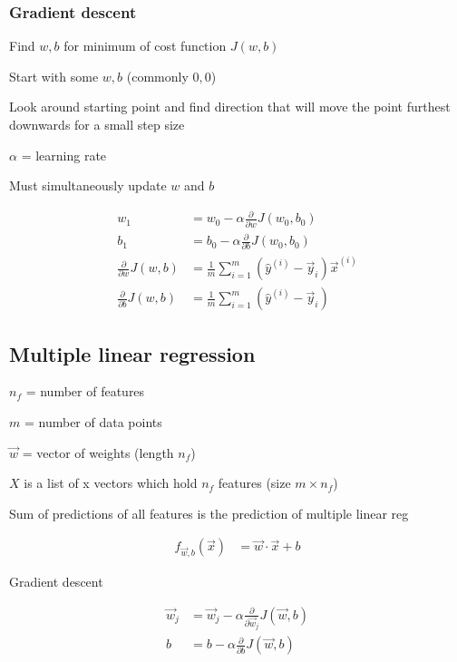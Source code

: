 \documentclass[12pt]{article}
\begin{document}
\subsubsection{Gradient descent}

Find $w,b$ for minimum of cost function $J(w,b)$

\begin{myenumerate}
	\item Start with some $w,b$ (commonly $0,0$)
	\item Look around starting point and find direction that will move the point furthest downwards for a small step size
\end{myenumerate}

$\alpha$ = learning rate

Must simultaneously update $w$ and $b$

\begin{align*}
    w_1 &= w_0 - \alpha \frac{\partial}{\partial w} J(w_0,b_0)\\
    b_1 &= b_0 - \alpha \frac{\partial}{\partial b} J(w_0,b_0)\\
    \frac{\partial}{\partial w} J(w,b) &= \frac{1}{m} \sum_{i=1}^m ({\hat y}^{(i)} - \vec{y}_i) \vec{x}^{(i)}\\
    \frac{\partial}{\partial b} J(w,b) &= \frac{1}{m} \sum_{i=1}^m ({\hat y}^{(i)} - \vec{y}_i)
\end{align*}

\subsection{Multiple linear regression}

$n_f$ = number of features

$m$ = number of data points

$\vec{w}$ = vector of weights (length $n_f$)

$X$ is a list of x vectors which hold $n_f$ features (size $m \times n_f$)

Sum of predictions of all features is the prediction of multiple linear reg

\begin{align*}
    f_{\vec{w},b}(\vec{x}) &= \vec{w} \cdot \vec{x} + b
\end{align*}

Gradient descent

\begin{align*}
    \vec{w}_j &= \vec{w}_j - \alpha \frac{\partial}{\partial \vec{w}_j} J(\vec{w},b)\\
    b &= b - \alpha \frac{\partial}{\partial b} J(\vec{w},b)
\end{align*}
\end{document}
